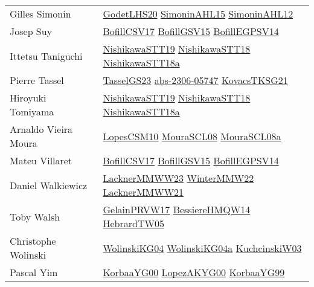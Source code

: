 {\begin{longtable}{p{4cm}p{20cm}}
Gilles Simonin & \href{papers/GodetLHS20.pdf}{GodetLHS20}\cite{GodetLHS20} \href{articles/SimoninAHL15.pdf}{SimoninAHL15}\cite{SimoninAHL15} \href{papers/SimoninAHL12.pdf}{SimoninAHL12}\cite{SimoninAHL12} \\
Josep Suy & \href{papers/BofillCSV17.pdf}{BofillCSV17}\cite{BofillCSV17} \href{papers/BofillGSV15.pdf}{BofillGSV15}\cite{BofillGSV15} \href{papers/BofillEGPSV14.pdf}{BofillEGPSV14}\cite{BofillEGPSV14} \\
Ittetsu Taniguchi & \href{articles/NishikawaSTT19.pdf}{NishikawaSTT19}\cite{NishikawaSTT19} \href{papers/NishikawaSTT18.pdf}{NishikawaSTT18}\cite{NishikawaSTT18} \href{papers/NishikawaSTT18a.pdf}{NishikawaSTT18a}\cite{NishikawaSTT18a} \\
Pierre Tassel & \href{papers/TasselGS23.pdf}{TasselGS23}\cite{TasselGS23} \href{articles/abs-2306-05747.pdf}{abs-2306-05747}\cite{abs-2306-05747} \href{papers/KovacsTKSG21.pdf}{KovacsTKSG21}\cite{KovacsTKSG21} \\
Hiroyuki Tomiyama & \href{articles/NishikawaSTT19.pdf}{NishikawaSTT19}\cite{NishikawaSTT19} \href{papers/NishikawaSTT18.pdf}{NishikawaSTT18}\cite{NishikawaSTT18} \href{papers/NishikawaSTT18a.pdf}{NishikawaSTT18a}\cite{NishikawaSTT18a} \\
Arnaldo Vieira Moura & \href{articles/LopesCSM10.pdf}{LopesCSM10}\cite{LopesCSM10} \href{papers/MouraSCL08.pdf}{MouraSCL08}\cite{MouraSCL08} \href{papers/MouraSCL08a.pdf}{MouraSCL08a}\cite{MouraSCL08a} \\
Mateu Villaret & \href{papers/BofillCSV17.pdf}{BofillCSV17}\cite{BofillCSV17} \href{papers/BofillGSV15.pdf}{BofillGSV15}\cite{BofillGSV15} \href{papers/BofillEGPSV14.pdf}{BofillEGPSV14}\cite{BofillEGPSV14} \\
Daniel Walkiewicz & \href{articles/LacknerMMWW23.pdf}{LacknerMMWW23}\cite{LacknerMMWW23} \href{papers/WinterMMW22.pdf}{WinterMMW22}\cite{WinterMMW22} \href{papers/LacknerMMWW21.pdf}{LacknerMMWW21}\cite{LacknerMMWW21} \\
Toby Walsh & \href{papers/GelainPRVW17.pdf}{GelainPRVW17}\cite{GelainPRVW17} \href{papers/BessiereHMQW14.pdf}{BessiereHMQW14}\cite{BessiereHMQW14} \href{papers/HebrardTW05.pdf}{HebrardTW05}\cite{HebrardTW05} \\
Christophe Wolinski & \href{papers/WolinskiKG04.pdf}{WolinskiKG04}\cite{WolinskiKG04} \href{papers/WolinskiKG04a.pdf}{WolinskiKG04a}\cite{WolinskiKG04a} \href{articles/KuchcinskiW03.pdf}{KuchcinskiW03}\cite{KuchcinskiW03} \\
Pascal Yim & \href{articles/KorbaaYG00.pdf}{KorbaaYG00}\cite{KorbaaYG00} \href{articles/LopezAKYG00.pdf}{LopezAKYG00}\cite{LopezAKYG00} \href{papers/KorbaaYG99.pdf}{KorbaaYG99}\cite{KorbaaYG99} \\

\end{longtable}}
